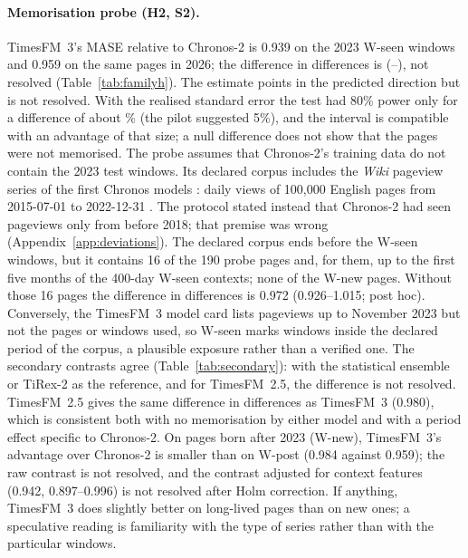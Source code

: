 \paragraph{Memorisation probe (H2, S2).} TimesFM~3's MASE relative to Chronos-2 is 0.939 on the 2023 W-seen windows and 0.959 on the
same pages in 2026; the difference in differences is \Htwo{} (\HtwoLo--\HtwoHi), not resolved (Table~\ref{tab:familyh}). The estimate points
in the predicted direction but is not resolved. With the realised standard error the test had 80\% power only for a difference of
about \HtwoMde\% (the pilot suggested 5\%), and the interval is compatible with an advantage of that size; a null difference does not
show that the pages were not memorised. The probe assumes that Chronos-2's training data do not contain the 2023 test windows. Its declared
corpus includes the \emph{Wiki} pageview series of the first Chronos models \citep{ansari2025chronos2}: daily views of 100{,}000
English pages from 2015-07-01 to 2022-12-31 \citep{ansari2024chronos}. The protocol stated instead that Chronos-2 had seen pageviews
only from before 2018; that premise was wrong (Appendix~\ref{app:deviations}). The declared corpus ends before the W-seen windows,
but it contains 16 of the 190 probe pages and, for them, up to the first five months of the 400-day W-seen contexts; none of the W-new
pages. Without those 16 pages the difference in differences is 0.972 (0.926--1.015; post hoc). Conversely, the TimesFM~3 model card
lists pageviews up to November 2023 but not the pages or windows used, so W-seen marks windows inside the declared period of the
corpus, a plausible exposure rather than a verified one. The secondary contrasts agree
(Table~\ref{tab:secondary}): with the statistical ensemble or TiRex-2 as the reference, and for TimesFM~2.5, the difference is not
resolved. TimesFM~2.5 gives the same difference in differences as TimesFM~3 (0.980), which is consistent both with no memorisation by
either model and with a period effect specific to Chronos-2. On pages born after 2023 (W-new), TimesFM~3's advantage over Chronos-2 is smaller than on W-post (0.984 against 0.959); the
raw contrast is not resolved, and the contrast adjusted for context features (0.942, 0.897--0.996) is not resolved after Holm
correction. If anything, TimesFM~3 does slightly better on long-lived pages than on new ones; a speculative reading is
familiarity with the type of series rather than with the particular windows.

